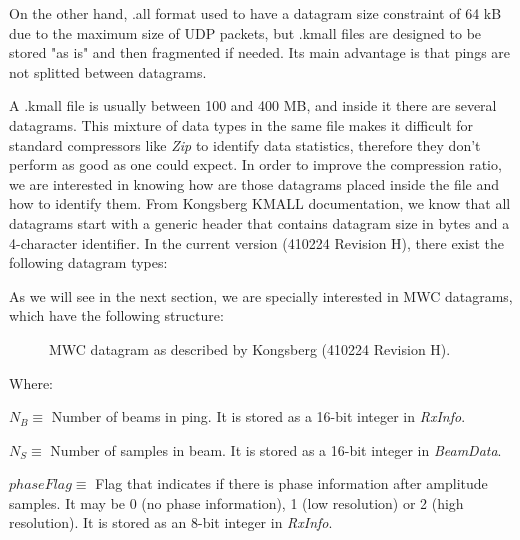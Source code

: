 On the other hand, .all format used to have a datagram size constraint of 64 kB due to the maximum size of UDP packets, but .kmall files are designed to be stored "as is" and then fragmented if needed. Its main advantage is that pings are not splitted between datagrams.

A .kmall file is usually between 100 and 400 MB, and inside it there are several datagrams. This mixture of data types in the same file makes it difficult for standard compressors like \textit{Zip} to identify data statistics, therefore they don't perform as good as one could expect. In order to improve the compression ratio, we are interested in knowing how are those datagrams placed inside the file and how to identify them. From Kongsberg KMALL documentation, we know that all datagrams start with a generic header that contains datagram size in bytes and a 4-character identifier. In the current version (410224 Revision H), there exist the following datagram types:

As we will see in the next section, we are specially interested in MWC datagrams, which have the following structure:

\begin{figure}[hb]
	\begin{center}
		\scalebox{.565}{}
	\end{center}
	\caption{MWC datagram as described by Kongsberg (410224 Revision H).}
	\label{fig:mwc_datagram}
\end{figure}

Where:
\begin{description}
	\item $N_B \equiv$ Number of beams in ping. It is stored as a 16-bit integer in \textit{RxInfo}.
	\item $N_S \equiv$ Number of samples in beam. It is stored as a 16-bit integer in \textit{BeamData}.
	\item $phaseFlag \equiv$ Flag that indicates if there is phase information after amplitude samples. It may be 0 (no phase information), 1 (low resolution) or 2 (high resolution). It is stored as an 8-bit integer in \textit{RxInfo}.
\end{description}

